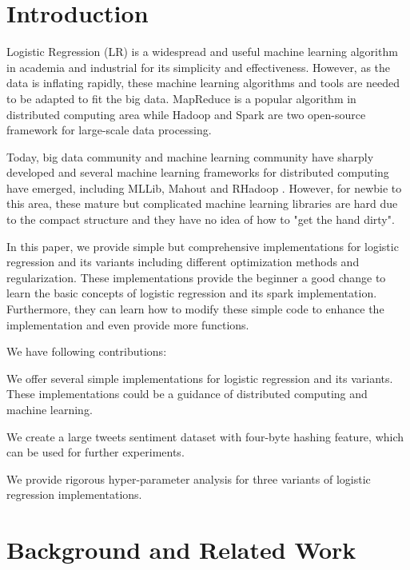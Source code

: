 \documentclass[sigconf]{acmart}
\begin{document}
\maketitle

\section{Introduction}
\label{sec:introduction}

Logistic Regression (LR) is a widespread and useful machine learning algorithm in academia and industrial for its simplicity and effectiveness. However, as the data is inflating rapidly, these machine learning algorithms and tools are needed to be adapted to fit the big data. MapReduce \cite{dean2008mapreduce} is a popular algorithm in distributed computing area while Hadoop \cite{shvachko2010hadoop} and Spark \cite{zaharia2010spark} are two open-source framework for large-scale data processing. 

Today, big data community and machine learning community have sharply developed and several machine learning frameworks for distributed computing have emerged, including MLLib, Mahout and RHadoop \cite{witten2016data}. However, for newbie to this area, these mature but complicated machine learning libraries are hard due to the compact structure and they have no idea of how to "get the hand dirty". 

In this paper, we provide simple but comprehensive implementations for logistic regression and its variants including different optimization methods and regularization. These implementations provide the beginner a good change to learn the basic concepts of logistic regression and its spark implementation. Furthermore, they can learn how to modify these simple code to enhance the implementation and even provide more functions. 

We have following contributions:

We offer several simple implementations for logistic regression and its variants. These implementations could be a guidance of distributed computing and machine learning. 

We create a large tweets sentiment dataset with four-byte hashing feature, which can be used for further experiments.

We provide rigorous hyper-parameter analysis for three variants of logistic regression implementations.

\section{Background and Related Work}
\label{sec:relatedWork}
\end{document}
